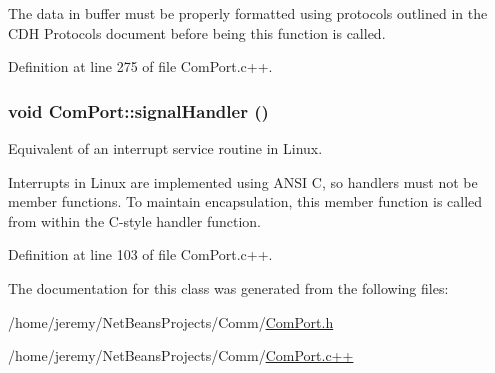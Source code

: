 The data in buffer must be properly formatted using protocols outlined in the CDH Protocols document before being this function is called. 

Definition at line 275 of file ComPort.c++.

\hypertarget{class_com_port_a6cbd25d3c52c3fd250109e86d998ce4b}{
\subsubsection[{signalHandler}]{\setlength{\rightskip}{0pt plus 5cm}void ComPort::signalHandler ()}}
\label{class_com_port_a6cbd25d3c52c3fd250109e86d998ce4b}
Equivalent of an interrupt service routine in Linux.

Interrupts in Linux are implemented using ANSI C, so handlers must not be member functions. To maintain encapsulation, this member function is called from within the C-\/style handler function. 

Definition at line 103 of file ComPort.c++.



The documentation for this class was generated from the following files:\begin{DoxyCompactItemize}
\item 
/home/jeremy/NetBeansProjects/Comm/\hyperlink{_com_port_8h}{ComPort.h}\item 
/home/jeremy/NetBeansProjects/Comm/\hyperlink{_com_port_8c_09_09}{ComPort.c++}\end{DoxyCompactItemize}
